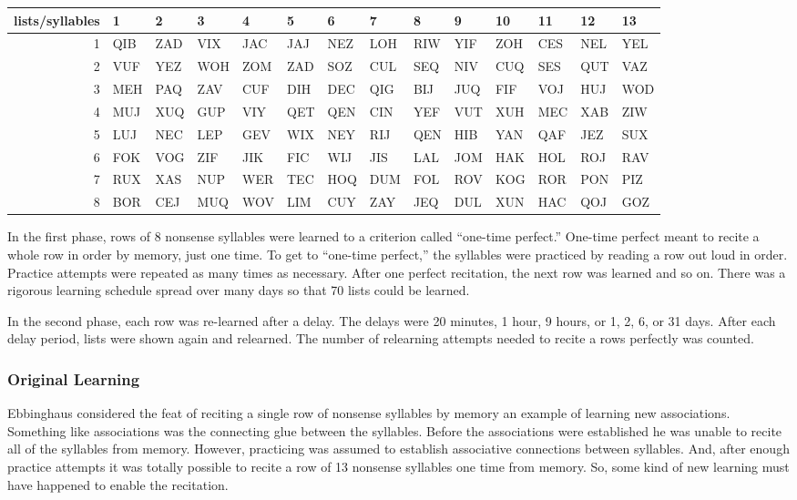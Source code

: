 \documentclass[
  oneside,
  12pt]{crumpbook}
\begin{document}
\begin{tabular}{r|l|l|l|l|l|l|l|l|l|l|l|l|l}
\hline
lists/syllables & 1 & 2 & 3 & 4 & 5 & 6 & 7 & 8 & 9 & 10 & 11 & 12 & 13\\
\hline
1 & QIB & ZAD & VIX & JAC & JAJ & NEZ & LOH & RIW & YIF & ZOH & CES & NEL & YEL\\
\hline
2 & VUF & YEZ & WOH & ZOM & ZAD & SOZ & CUL & SEQ & NIV & CUQ & SES & QUT & VAZ\\
\hline
3 & MEH & PAQ & ZAV & CUF & DIH & DEC & QIG & BIJ & JUQ & FIF & VOJ & HUJ & WOD\\
\hline
4 & MUJ & XUQ & GUP & VIY & QET & QEN & CIN & YEF & VUT & XUH & MEC & XAB & ZIW\\
\hline
5 & LUJ & NEC & LEP & GEV & WIX & NEY & RIJ & QEN & HIB & YAN & QAF & JEZ & SUX\\
\hline
6 & FOK & VOG & ZIF & JIK & FIC & WIJ & JIS & LAL & JOM & HAK & HOL & ROJ & RAV\\
\hline
7 & RUX & XAS & NUP & WER & TEC & HOQ & DUM & FOL & ROV & KOG & ROR & PON & PIZ\\
\hline
8 & BOR & CEJ & MUQ & WOV & LIM & CUY & ZAY & JEQ & DUL & XUN & HAC & QOJ & GOZ\\
\hline
\end{tabular}

In the first phase, rows of 8 nonsense syllables were learned to a criterion called ``one-time perfect.'' One-time perfect meant to recite a whole row in order by memory, just one time. To get to ``one-time perfect,'' the syllables were practiced by reading a row out loud in order. Practice attempts were repeated as many times as necessary. After one perfect recitation, the next row was learned and so on. There was a rigorous learning schedule spread over many days so that 70 lists could be learned.

In the second phase, each row was re-learned after a delay. The delays were 20 minutes, 1 hour, 9 hours, or 1, 2, 6, or 31 days. After each delay period, lists were shown again and relearned. The number of relearning attempts needed to recite a rows perfectly was counted.

\hypertarget{original-learning}{%
\subsubsection{Original Learning}\label{original-learning}}

Ebbinghaus considered the feat of reciting a single row of nonsense syllables by memory an example of learning new associations. Something like associations was the connecting glue between the syllables. Before the associations were established he was unable to recite all of the syllables from memory. However, practicing was assumed to establish associative connections between syllables. And, after enough practice attempts it was totally possible to recite a row of 13 nonsense syllables one time from memory. So, some kind of new learning must have happened to enable the recitation.
\end{document}
